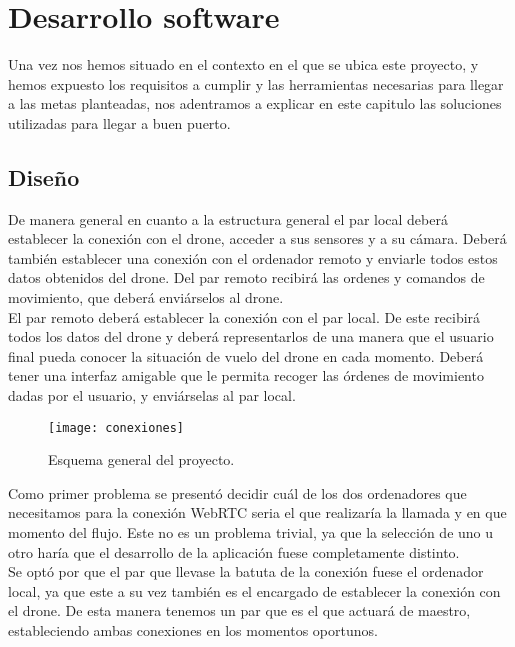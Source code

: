 \chapter{Desarrollo software}

Una vez nos hemos situado en el contexto en el que se ubica este proyecto, y hemos expuesto los requisitos a cumplir y las herramientas necesarias para llegar a las metas planteadas, nos adentramos a explicar en este capitulo las soluciones utilizadas para llegar a buen puerto.\\

\section{Diseño}

De manera general en cuanto a la estructura general el par local deberá establecer la conexión con el drone, acceder a sus sensores y a su cámara. Deberá también establecer una conexión con el ordenador remoto y enviarle todos estos datos obtenidos del drone. Del par remoto recibirá las ordenes y comandos de movimiento, que deberá enviárselos al drone.\\

El par remoto deberá establecer la conexión con el par local. De este recibirá todos los datos del drone y deberá representarlos de una manera que el usuario final pueda conocer la situación de vuelo del drone en cada momento. Deberá tener una interfaz amigable que le permita recoger las órdenes de movimiento dadas por el usuario, y enviárselas al par local.\\

\begin{figure}[h!]
\centering
\texttt{[image: conexiones]}
\caption{Esquema general del proyecto.}
\label{fig:esquemageneral}
\end{figure}

Como primer problema se presentó decidir cuál de los dos ordenadores que necesitamos para la conexión WebRTC seria el que realizaría la llamada y en que momento del flujo. Este no es un problema trivial, ya que la selección de uno u otro haría que el desarrollo de la aplicación fuese completamente distinto.\\

Se optó por que el par que llevase la batuta de la conexión fuese el ordenador local, ya que este a su vez también es el encargado de  establecer la conexión con el drone. De esta manera tenemos un par que es el que actuará de maestro, estableciendo ambas conexiones en los momentos oportunos.\\

